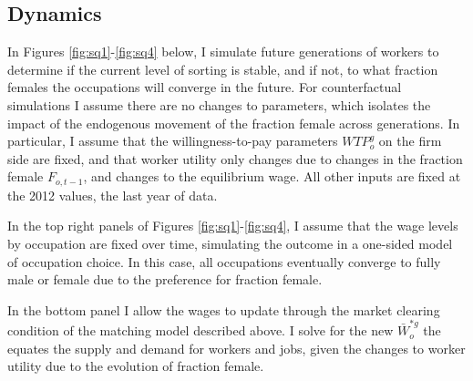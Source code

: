 \documentclass[12pt]{article}
\begin{document}
\subsection{Dynamics}


In Figures \ref{fig:sq1}-\ref{fig:sq4} below, I simulate future generations of workers to determine if the current level of sorting is stable, and if not, to what fraction females the occupations will converge in the future. For counterfactual simulations I assume there are no changes to parameters, which isolates the impact of the endogenous movement of the fraction female across generations. In particular, I assume that the willingness-to-pay parameters $WTP^g_o$ on the firm side are fixed, and that worker utility only changes due to changes in the fraction female $F_{o,t-1}$, and changes to the equilibrium wage. All other inputs are fixed at the 2012 values, the last year of data. 




In the top right panels of Figures \ref{fig:sq1}-\ref{fig:sq4}, I assume that the wage levels by occupation are fixed over time, simulating the outcome in a one-sided model of occupation choice. In this case, all occupations eventually converge to fully male or female due to the preference for fraction female.



In the bottom panel I allow the wages to update through the market clearing condition of the matching model described above. I solve for the new $ \bar{W}^{*g}_o$ the equates the supply and demand for workers and jobs, given the changes to worker utility due to the evolution of fraction female. 


\end{document}
